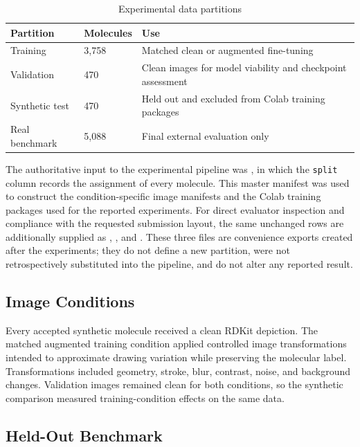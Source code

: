 \documentclass[11pt,a4paper]{article}
\begin{document}
\begin{table}[H]
\centering
\caption{Experimental data partitions}
\begin{tabularx}{\textwidth}{L{3cm}C{2.2cm}Y}
\toprule
\textbf{Partition} & \textbf{Molecules} & \textbf{Use} \\
\midrule
Training & 3,758 & Matched clean or augmented fine-tuning \\
Validation & 470 & Clean images for model viability and checkpoint assessment \\
Synthetic test & 470 & Held out and excluded from Colab training packages \\
Real benchmark & 5,088 & Final external evaluation only \\
\bottomrule
\end{tabularx}
\end{table}

The authoritative input to the experimental pipeline was
, in which the \texttt{split} column records
the assignment of every molecule. This master manifest was used to construct the
condition-specific image manifests and the Colab training packages used for the reported
experiments. For direct evaluator inspection and compliance with the requested submission
layout, the same unchanged rows are additionally supplied as ,
, and . These three files are convenience
exports created after the experiments; they do not define a new partition, were not
retrospectively substituted into the pipeline, and do not alter any reported result.

\subsection*{Image Conditions}

Every accepted synthetic molecule received a clean RDKit depiction. The matched augmented
training condition applied controlled image transformations intended to approximate drawing
variation while preserving the molecular label. Transformations included geometry, stroke,
blur, contrast, noise, and background changes. Validation images remained clean for both
conditions, so the synthetic comparison measured training-condition effects on the same data.

\subsection*{Held-Out Benchmark}
\end{document}
